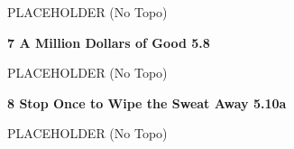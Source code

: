 \begin{multicols}{2}
					\begin{adjustwidth}{0.5cm}{}				
					PLACEHOLDER
						\newline (No Topo) 
					\end{adjustwidth}
					\label{rt:A Million Dollars of Good}
\colorbox{green!20}{
\parbox{0.95\linewidth}{
\textbf{
7 A Million Dollars of Good 5.8    
}
}
}

					\begin{adjustwidth}{0.5cm}{}				
					PLACEHOLDER
						\newline (No Topo) 
					\end{adjustwidth}
					\label{rt:Stop Once to Wipe the Sweat Away}
\colorbox{RoyalBlue!20}{
\parbox{0.95\linewidth}{
\textbf{
8 Stop Once to Wipe the Sweat Away 5.10a   
}
}
}

					\begin{adjustwidth}{0.5cm}{}				
					PLACEHOLDER
						\newline (No Topo) 
					\end{adjustwidth}
\end{multicols}
\clearpage